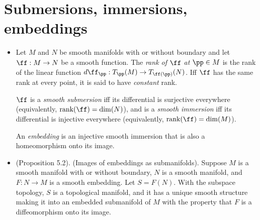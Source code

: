 
\section{Submersions, immersions, embeddings}

\begin{itemize}
    \item Let $M$ and $N$ be smooth manifolds with or without boundary and let $\ff:M \rightarrow N$ be a smooth function. The \textit{rank of $\ff$ at $\pp \in M$} is the rank of the linear function $d\ff_\pp:T_\pp(M) \rightarrow T_{\ff(\pp)}(N)$. Iff $\ff$ has the same rank at every point, it is said to have \textit{constant} rank.
    
    $\ff$ is a \textit{smooth submersion} iff its differential is surjective everywhere (equivalently, $\text{rank}(\ff) = \dim(N)$), and is a \textit{smooth immersion} iff its differential is injective everywhere (equivalently, $\text{rank}(\ff) = \dim(M)$).
    
    An \textit{embedding} is an injective smooth immersion that is also a homeomorphism onto its image.
    
    \item (Proposition 5.2). (Images of embeddings as submanifolds). Suppose $M$ is a smooth manifold with or without boundary, $N$ is a smooth manifold, and $F:N \rightarrow M$ is a smooth embedding. Let $S = F(N)$. With the subspace topology, $S$ is a topological manifold, and it has a unique smooth structure making it into an embedded submanifold of $M$ with the property that $F$ is a diffeomorphism onto its image.
\end{itemize}



